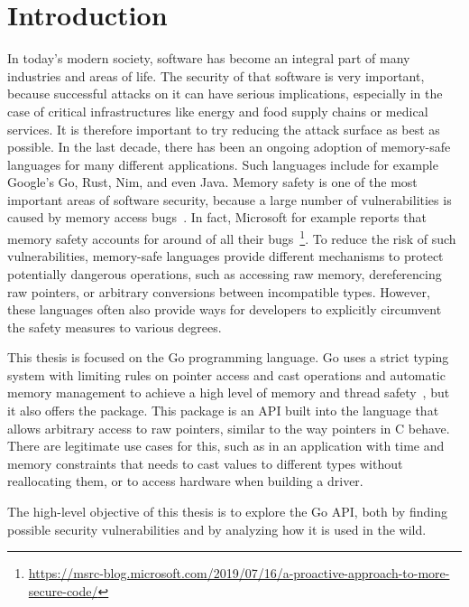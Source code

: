 
\chapter{Introduction}\label{ch:introduction}

In today's modern society, software has become an integral part of many industries and areas of life.
The security of that software is very important, because successful attacks on it can have serious implications,
especially in the case of critical infrastructures like energy and food supply chains or medical services.
It is therefore important to try reducing the attack surface as best as possible.
In the last decade, there has been an ongoing adoption of memory-safe languages for many different applications.
Such languages include for example Google's Go, Rust, Nim, and even Java.
Memory safety is one of the most important areas of software security, because a large number of vulnerabilities is
caused by memory access bugs~\cite{heffley2004}.
In fact, Microsoft for example reports that memory safety accounts for around  of all their
bugs~\footnote{\scriptsize\url{https://msrc-blog.microsoft.com/2019/07/16/a-proactive-approach-to-more-secure-code/}}.
To reduce the risk of such vulnerabilities, memory-safe languages provide different mechanisms to protect potentially
dangerous operations, such as accessing raw memory, dereferencing raw pointers, or arbitrary conversions between
incompatible types.
However, these languages often also provide ways for developers to explicitly circumvent the safety measures to various
degrees.

This thesis is focused on the Go programming language.
Go uses a strict typing system with limiting rules on pointer access and cast operations and automatic memory management
to achieve a high level of memory and thread safety~\cite{sibiryov2017}, but it also offers the \unsafe{} package.
This package is an \acrshort{API} built into the language that allows arbitrary access to raw pointers, similar to the
way pointers in C behave.
There are legitimate use cases for this, such as in an application with time and memory constraints that needs to cast
values to different types without reallocating them, or to access hardware when building a driver.

\begin{hero}
    The high-level objective of this thesis is to explore the Go \unsafe{} \acrshort{API}, both by finding possible
    security vulnerabilities and by analyzing how it is used in the wild.
\end{hero}

